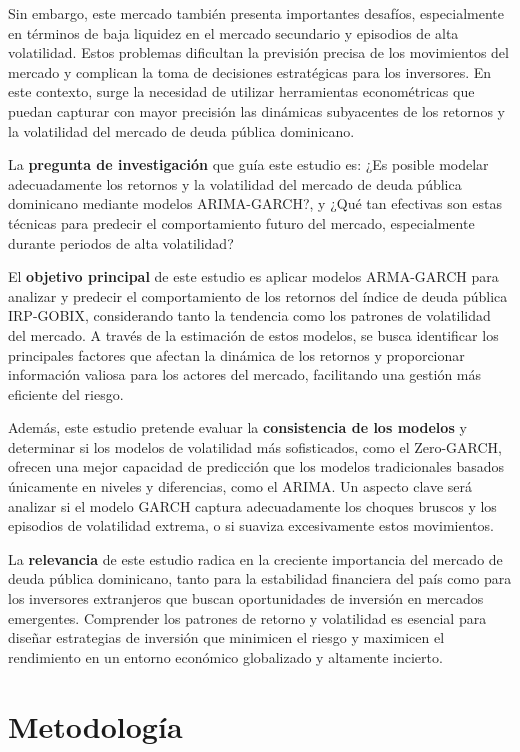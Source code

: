 \documentclass[
  number,
  preprint,
  3p,
  onecolumn]{elsarticle}
\begin{document}
Sin embargo, este mercado también presenta importantes desafíos,
especialmente en términos de baja liquidez en el mercado secundario y
episodios de alta volatilidad. Estos problemas dificultan la previsión
precisa de los movimientos del mercado y complican la toma de decisiones
estratégicas para los inversores. En este contexto, surge la necesidad
de utilizar herramientas econométricas que puedan capturar con mayor
precisión las dinámicas subyacentes de los retornos y la volatilidad del
mercado de deuda pública dominicano.

La \textbf{pregunta de investigación} que guía este estudio es: ¿Es
posible modelar adecuadamente los retornos y la volatilidad del mercado
de deuda pública dominicano mediante modelos ARIMA-GARCH?, y ¿Qué tan
efectivas son estas técnicas para predecir el comportamiento futuro del
mercado, especialmente durante periodos de alta volatilidad?

El \textbf{objetivo principal} de este estudio es aplicar modelos
ARMA-GARCH para analizar y predecir el comportamiento de los retornos
del índice de deuda pública IRP-GOBIX, considerando tanto la tendencia
como los patrones de volatilidad del mercado. A través de la estimación
de estos modelos, se busca identificar los principales factores que
afectan la dinámica de los retornos y proporcionar información valiosa
para los actores del mercado, facilitando una gestión más eficiente del
riesgo.

Además, este estudio pretende evaluar la \textbf{consistencia de los
modelos} y determinar si los modelos de volatilidad más sofisticados,
como el Zero-GARCH, ofrecen una mejor capacidad de predicción que los
modelos tradicionales basados únicamente en niveles y diferencias, como
el ARIMA. Un aspecto clave será analizar si el modelo GARCH captura
adecuadamente los choques bruscos y los episodios de volatilidad
extrema, o si suaviza excesivamente estos movimientos.

La \textbf{relevancia} de este estudio radica en la creciente
importancia del mercado de deuda pública dominicano, tanto para la
estabilidad financiera del país como para los inversores extranjeros que
buscan oportunidades de inversión en mercados emergentes. Comprender los
patrones de retorno y volatilidad es esencial para diseñar estrategias
de inversión que minimicen el riesgo y maximicen el rendimiento en un
entorno económico globalizado y altamente incierto.

\section{Metodología}\label{metodologuxeda}
\end{document}
